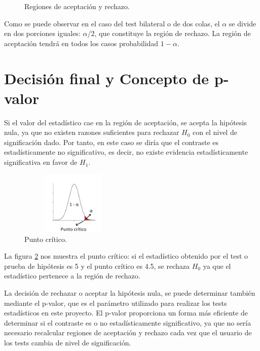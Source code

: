 \begin{figure}[h]
\centering
{}
\caption{Regiones de aceptación y rechazo.}
\label{fig:intervalos_normal}
\end{figure}

Como se puede observar en el caso del test bilateral o de dos colas, el $\alpha$ se divide en dos porciones iguales:
$\alpha / 2$, que constituye la región de rechazo. La región de aceptación tendrá en todos los casos probabilidad
$1 - \alpha$.


\section{Decisión final y Concepto de p-valor}
Si el valor del estadístico cae en la región de aceptación, se acepta la hipótesis nula, ya que no existen
razones suficientes para rechazar $H_0$ con el nivel de significación dado. Por tanto, en este caso se diría
que el contraste es estadísticamente no significativo, es decir, no existe evidencia estadísticamente significativa
en favor de $H_1$.
\begin{figure}[h]
\centering
\includegraphics[width=5cm,height=3cm]{figuras/critico.png}
\caption{Punto crítico.}
\label{fig:punto_critico}
\end{figure}
La figura \ref{fig:punto_critico} nos muestra el punto crítico: si el estadístico obtenido por el test o
prueba de hipótesis es 5 y el punto crítico es 4.5, se rechaza $H_0$ ya que el estadístico pertenece a la
región de rechazo.

La decisión de rechazar o aceptar la hipótesis nula, se puede determinar también mediante el p-valor,
que es el parámetro utilizado para realizar los tests estadísticos en este proyecto. El p-valor proporciona
un forma más eficiente de determinar si el contraste es o no estadísticamente significativo, ya que no sería
necesario recalcular regiones de aceptación y rechazo cada vez que el usuario de los tests cambia de nivel de
significación.


